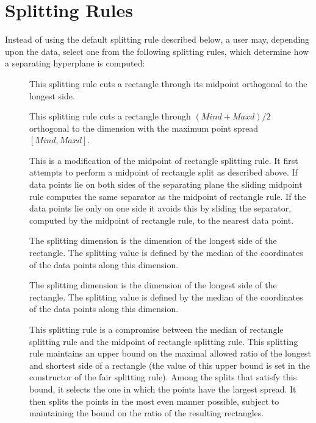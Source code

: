 \section{Splitting Rules\label{Spatial_Searching:Splitting_rule_section}}

Instead of using the default splitting rule  described below,
a user may, depending upon the data, select 
one from the following splitting rules,
which determine how a separating hyperplane is computed:

\begin{description}

\item[ ]

This splitting rule cuts a rectangle through its midpoint orthogonal
to the longest side.

\item[ ]

This splitting rule cuts a rectangle through $(Mind+Maxd)/2$ orthogonal
to the dimension with the maximum point spread $[Mind,Maxd]$.

\item[ ]

This is a modification of the midpoint of rectangle splitting rule.
It first attempts to perform a midpoint of rectangle split as
described above. If data points lie on both sides of the separating
plane the sliding midpoint rule computes the same separator as
the midpoint of rectangle rule. If the data points lie only on one
side it avoids this by sliding the separator, computed by
the midpoint of rectangle rule, to the nearest data point.

\item[ ]

The splitting dimension is the dimension of the longest side of the rectangle.
The splitting value is defined by the median of the coordinates of the data points
along this dimension.

\item[ ]

The splitting dimension is the dimension of the longest side of the rectangle.
The splitting value is defined by the median of the coordinates of the data points
along this dimension.

\item[ ]

This splitting rule is a compromise between the median of rectangle
splitting rule and the midpoint of rectangle splitting rule. This
splitting rule maintains an upper bound on the maximal allowed ratio
of the longest and shortest side of a rectangle (the value of this
upper bound is set in the constructor of the fair splitting
rule). Among the splits that satisfy this bound, it selects the one in
which the points have the largest spread.  It then splits the points
in the most even manner possible, subject to maintaining the bound on
the ratio of the resulting rectangles.


\end{description}
